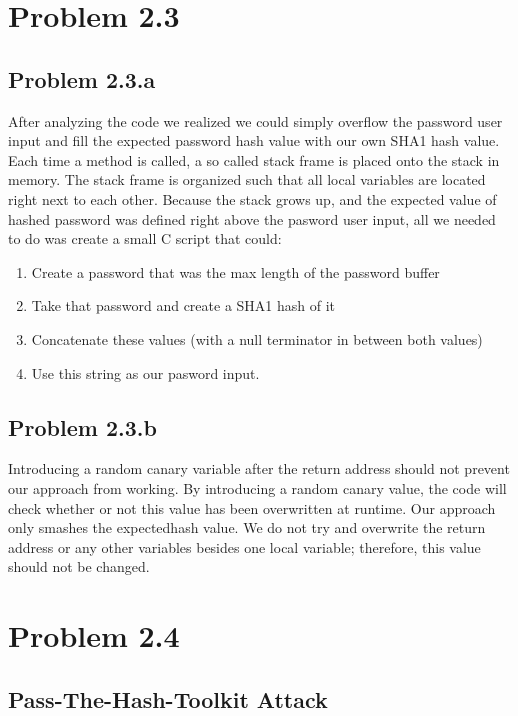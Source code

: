 \documentclass[psamsfonts]{amsart}
\begin{document}
 \section*{Problem 2.3}

 \subsection*{Problem 2.3.a}
 After analyzing the code we realized we could simply overflow the password user input and fill the expected password hash value with our own SHA1 hash value.  Each time a method is called, a so called stack frame is placed onto the stack in memory.  The stack frame is organized such that all local variables are located right next to each other.  Because the stack grows up, and the expected value of hashed password was defined right above the pasword user input, all we needed to do was create a small C script that could:

     \begin{enumerate}[(1)]
       \item Create a password that was the max length of the password buffer
       \item Take that password and create a SHA1 hash of it
       \item Concatenate these values (with a null terminator in between both values)
       \item Use this string as our pasword input.
     \end{enumerate}

 \subsection*{Problem 2.3.b}
    Introducing a random canary variable after the return address should not prevent our approach from working.  By introducing a random canary value, the code will check whether or not this value has been overwritten at runtime.  Our approach only smashes the expectedhash value.  We do not try and overwrite the return address or any other variables besides one local variable; therefore, this value should not be changed.

\section*{Problem 2.4}

\subsection*{Pass-The-Hash-Toolkit Attack}
\end{document}
